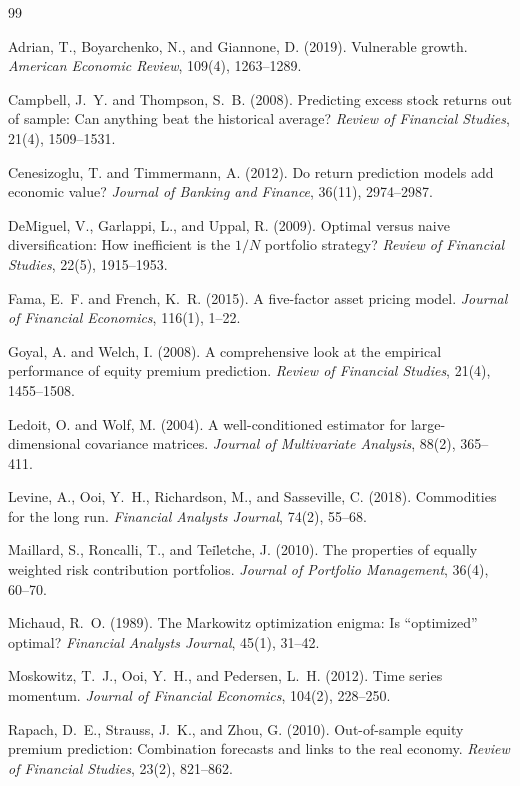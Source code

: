 \documentclass[11pt,letterpaper]{article}
\begin{document}

\begin{thebibliography}{99}

Adrian, T., Boyarchenko, N., and Giannone, D. (2019).
Vulnerable growth.
\textit{American Economic Review}, 109(4), 1263--1289.

Campbell, J.~Y. and Thompson, S.~B. (2008).
Predicting excess stock returns out of sample: Can anything beat the historical average?
\textit{Review of Financial Studies}, 21(4), 1509--1531.

Cenesizoglu, T. and Timmermann, A. (2012).
Do return prediction models add economic value?
\textit{Journal of Banking and Finance}, 36(11), 2974--2987.

DeMiguel, V., Garlappi, L., and Uppal, R. (2009).
Optimal versus naive diversification: How inefficient is the $1/N$ portfolio strategy?
\textit{Review of Financial Studies}, 22(5), 1915--1953.

Fama, E.~F. and French, K.~R. (2015).
A five-factor asset pricing model.
\textit{Journal of Financial Economics}, 116(1), 1--22.

Goyal, A. and Welch, I. (2008).
A comprehensive look at the empirical performance of equity premium prediction.
\textit{Review of Financial Studies}, 21(4), 1455--1508.

Ledoit, O. and Wolf, M. (2004).
A well-conditioned estimator for large-dimensional covariance matrices.
\textit{Journal of Multivariate Analysis}, 88(2), 365--411.

Levine, A., Ooi, Y.~H., Richardson, M., and Sasseville, C. (2018).
Commodities for the long run.
\textit{Financial Analysts Journal}, 74(2), 55--68.

Maillard, S., Roncalli, T., and Tei\"{l}etche, J. (2010).
The properties of equally weighted risk contribution portfolios.
\textit{Journal of Portfolio Management}, 36(4), 60--70.

Michaud, R.~O. (1989).
The Markowitz optimization enigma: Is ``optimized'' optimal?
\textit{Financial Analysts Journal}, 45(1), 31--42.

Moskowitz, T.~J., Ooi, Y.~H., and Pedersen, L.~H. (2012).
Time series momentum.
\textit{Journal of Financial Economics}, 104(2), 228--250.

Rapach, D.~E., Strauss, J.~K., and Zhou, G. (2010).
Out-of-sample equity premium prediction: Combination forecasts and links to the real economy.
\textit{Review of Financial Studies}, 23(2), 821--862.

\end{thebibliography}
\end{document}
